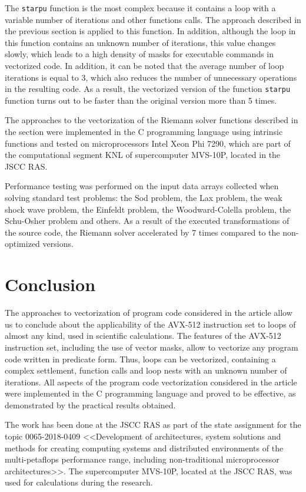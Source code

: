 \documentclass[
11pt,%
tightenlines,%
twoside,%
onecolumn,%
nofloats,%
nobibnotes,%
nofootinbib,%
superscriptaddress,%
noshowpacs,%
centertags]%
{revtex4}
\begin{document}
The \texttt{starpu} function is the most complex because it contains a loop with a variable number of iterations and other functions calls.
The approach described in the previous section is applied to this function.
In addition, although the loop in this function contains an unknown number of iterations, this value changes slowly, which leads to a high density of masks for executable commands in vectorized code.
In addition, it can be noted that the average number of loop iterations is equal to 3, which also reduces the number of unnecessary operations in the resulting code.
As a result, the vectorized version of the function \texttt{starpu} function turns out to be faster than the original version more than 5 times.

The approaches to the vectorization of the Riemann solver functions described in the section were implemented in the C programming language using intrinsic functions and tested on microprocessors Intel Xeon Phi 7290, which are part of the computational segment KNL of supercomputer MVS-10P, located in the JSCC RAS.

Performance testing was performed on the input data arrays collected when solving standard test problems: the Sod problem, the Lax problem, the weak shock wave problem, the Einfeldt problem, the Woodward-Colella problem, the Schu-Osher problem and others.
As a result of the executed transformations of the source code, the Riemann solver accelerated by 7 times compared to the non-optimized versions.

\section{Conclusion}

The approaches to vectorization of program code considered in the article allow us to conclude about the applicability of the AVX-512 instruction set to loops of almost any kind, used in scientific calculations.
The features of the AVX-512 instruction set, including the use of vector masks, allow to vectorize any program code written in predicate form.
Thus, loops can be vectorized, containing a complex settlement, function calls and loop nests with an unknown number of iterations.
All aspects of the program code vectorization considered in the article were implemented in the C programming language and proved to be effective, as demonstrated by the practical results obtained.

\begin{acknowledgments}
The work has been done at the JSCC RAS as part of the state assignment for the topic 0065-2018-0409 <<Development of architectures, system solutions and methods for creating computing systems and distributed environments of the multi-petaflops performance range, including non-traditional microprocessor architectures>>. The supercomputer MVS-10P, located at the JSCC RAS, was used for calculations during the research.
\end{acknowledgments}
\end{document}
